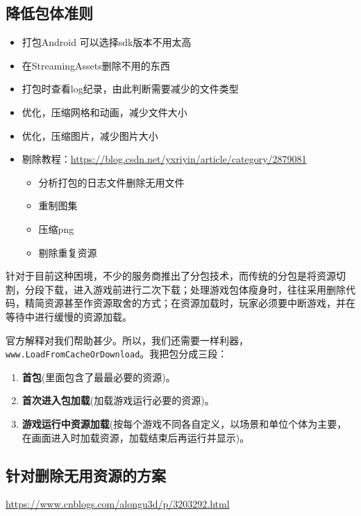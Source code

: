 \documentclass[UTF8,a4paper,12pt]{ctexbook}
\begin{document}
		\subsection{降低包体准则}
			\begin{itemize}
				\renewcommand\labelitemi{\makebox[0pt][l]{$\square$}\raisebox{.15ex}{\hspace{0.1em}$\checkmark$}}
				\item 打包Android 可以选择sdk版本不用太高
				\renewcommand\labelitemi{\makebox[0pt][l]{$\square$}\hspace{1em}}
				\item 在StreamingAssets删除不用的东西
				\item 打包时查看log纪录，由此判断需要减少的文件类型
				\item 优化，压缩网格和动画，减少文件大小
				\item 优化，压缩图片，减少图片大小
				\item 剔除教程：\url{https://blog.csdn.net/yxriyin/article/category/2879081}
					\begin{itemize}
						\item 分析打包的日志文件删除无用文件
						\item 重制图集
						\item 压缩png
						\item 剔除重复资源
					\end{itemize}
			\end{itemize}
		
			针对于目前这种困境，不少的服务商推出了分包技术，而传统的分包是将资源切割，分段下载，进入游戏前进行二次下载；处理游戏包体瘦身时，往往采用删除代码，精简资源甚至作资源取舍的方式；在资源加载时，玩家必须要中断游戏，并在等待中进行缓慢的资源加载。
			
			官方解释对我们帮助甚少。所以，我们还需要一样利器，\verb|www.LoadFromCacheOrDownload|。我把包分成三段：
				\begin{enumerate}
					\item \textbf{首包}(里面包含了最最必要的资源)。
					\item \textbf{首次进入包加载}(加载游戏运行必要的资源)。
					\item \textbf{游戏运行中资源加载}(按每个游戏不同各自定义，以场景和单位个体为主要，在画面进入时加载资源，加载结束后再运行并显示)。
				\end{enumerate}
			
			
		\subsection{针对删除无用资源的方案}
			\url{https://www.cnblogs.com/alongu3d/p/3203292.html}
			
\end{document}
